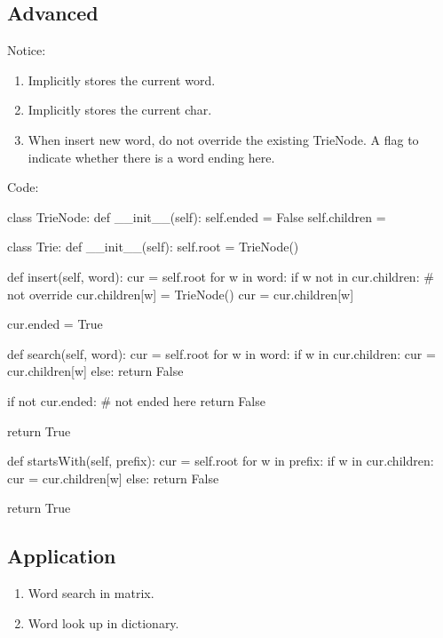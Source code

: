 \subsection{Advanced}
Notice:
\begin{enumerate}
\item Implicitly stores the current word. 
\item Implicitly stores the current char. 
\item When insert new word, do not override the existing TrieNode. A flag to indicate whether there is a word ending here.
\end{enumerate}
Code:
\begin{python}
class TrieNode:
    def __init__(self):
        self.ended = False
        self.children = {}


class Trie:
    def __init__(self):
        self.root = TrieNode()

    def insert(self, word):
        cur = self.root
        for w in word:
            if w not in cur.children:   # not override
                cur.children[w] = TrieNode()
            cur = cur.children[w]

        cur.ended = True

    def search(self, word):
        cur = self.root
        for w in word:
            if w in cur.children:
                cur = cur.children[w]
            else:
                return False

        if not cur.ended:  # not ended here
            return False

        return True

    def startsWith(self, prefix):
        cur = self.root
        for w in prefix:
            if w in cur.children:
                cur = cur.children[w]
            else:
                return False

        return True
\end{python}
\subsection{Application}
\begin{enumerate}
\item Word search in matrix.
\item Word look up in dictionary.
\end{enumerate}


